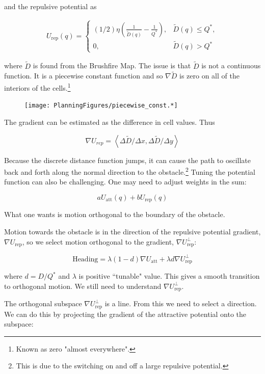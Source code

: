 and the repulsive potential as

\[\begin{aligned}
U_\text{rep}(q) = \left\{ \begin{array}{ll} (1/2)\eta \left( \frac{1}{\tilde{D}(q)} - \frac{1}{Q^*}\right) , &
\tilde{D}(q) \leq Q^*,\\[3mm]
0, & \tilde{D}(q) > Q^*
\end{array}\right.
\end{aligned}\]

where \(\tilde{D}\) is found from the Brushfire Map. The issue is that
\(\tilde{D}\) is not a continuous function. It is a piecewise constant
function and so \(\nabla \tilde{D}\) is zero on all of the interiors of
the cells.\footnote{Known as zero "almost everywhere".}

\begin{figure}
\centering
\texttt{[image: PlanningFigures/piecewise\_const.*]}
\caption{}
\end{figure}

The gradient can be estimated as the difference in cell values. Thus

\[\nabla U_{rep}  = \left< \Delta \tilde{D} / \Delta x , \Delta  \tilde{D} / \Delta y \right>\]

Because the discrete distance function jumps, it can cause the path to
oscillate back and forth along the normal direction to the
obstacle.\footnote{This is due to the switching on and off a large
  repulsive potential.} Tuning the potential function can also be
challenging. One may need to adjust weights in the sum:

\[aU_\text{att}(q) + bU_\text{rep}(q)\]

What one wants is motion orthogonal to the boundary of the obstacle.

Motion towards the obstacle is in the direction of the repulsive
potential gradient, \(\nabla U_\text{rep}\), so we select motion
orthogonal to the gradient, \(\nabla U_\text{rep}^{\perp}\):

\[\mbox{Heading} = \lambda (1-d) \nabla U_\text{att} + \lambda d \nabla U_\text{rep}^{\perp}\]

where \(d = D/Q^*\) and \(\lambda\) is positive ``tunable" value. This
gives a smooth transition to orthogonal motion. We still need to
understand \(\nabla U_\text{rep}^{\perp}\).

The orthogonal subspace \(\nabla U_\text{rep}^{\perp}\) is a line. From
this we need to select a direction. We can do this by projecting the
gradient of the attractive potential onto the subspace:

